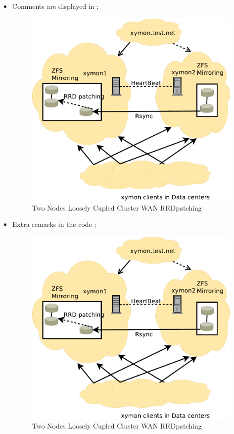 \begin{itemize}
\item Comments are displayed in ;
\begin{figure}[H]
\caption{Two Nodes Loosely Cupled Cluster WAN RRDpatching}
\label{TwoNodeLooselyCpupledClusterWAN-RRDpatching2}
\begin{center}
\includegraphics[scale=0.65]{dia/TwoNodeLooselyCpupledClusterWAN-RRDpatching.pdf}
\end{center}
\end{figure}

\item Extra remarks in the code ;
\begin{figure}[H]
\caption{Two Nodes Loosely Cupled Cluster WAN RRDpatching}
\label{TwoNodeLooselyCpupledClusterWAN-RRDpatching3}
\begin{center}
\includegraphics[scale=0.65]{dia/TwoNodeLooselyCpupledClusterWAN-RRDpatching.pdf}
\end{center}
\end{figure}


\end{itemize}
